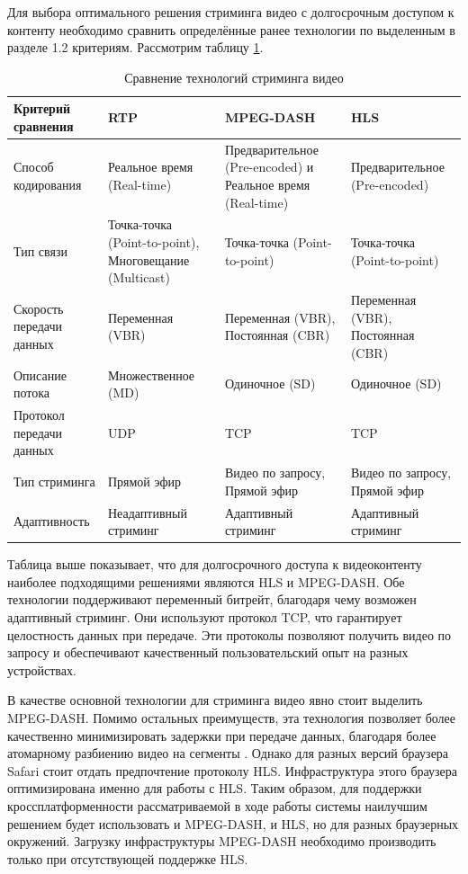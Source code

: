 	Для выбора оптимального решения стриминга видео с долгосрочным доступом к контенту необходимо сравнить определённые ранее технологии по выделенным в разделе 1.2 критериям. Рассмотрим таблицу \ref{fig:streaming_compare}.

	\begin{table} [htbp]%
		\centering\small
		\caption{Сравнение технологий стриминга видео}%
		\begin{tabular}{|p{3.5cm}|p{3.5cm}|p{3.5cm}|p{3.5cm}|}
			\hline
			Критерий сравнения&RTP&MPEG-DASH&HLS\\
			\hline
			Способ кодирования&Реальное время (Real-time)&Предварительное (Pre-encoded) и Реальное время (Real-time)&Предварительное (Pre-encoded)\\ \hline
			Тип связи&Точка-точка (Point-to-point), Многовещание (Multicast)&Точка-точка (Point-to-point)&Точка-точка (Point-to-point)\\ \hline
			Скорость передачи данных&Переменная (VBR)&Переменная (VBR), Постоянная (CBR)&Переменная (VBR), Постоянная (CBR)\\ \hline
			Описание потока&Множественное (MD)&Одиночное (SD)&Одиночное (SD)\\ \hline
			Протокол передачи данных&UDP&TCP&TCP\\ \hline
			Тип стриминга&Прямой эфир&Видео по запросу, Прямой эфир&Видео по запросу, Прямой эфир\\ \hline		
			Адаптивность&Неадаптивный стриминг&Адаптивный стриминг&Адаптивный стриминг\\ \hline		
		\end{tabular}	
		\label{fig:streaming_compare}
		\normalsize%
	\end{table}
	
	Таблица выше показывает, что для долгосрочного доступа к видеоконтенту наиболее подходящими решениями являются HLS и MPEG-DASH. Обе технологии поддерживают переменный битрейт, благодаря чему возможен адаптивный стриминг. Они используют протокол TCP, что гарантирует целостность данных при передаче. Эти протоколы позволяют получить видео по запросу и обеспечивают качественный пользовательский опыт на разных устройствах.
	
	В качестве основной технологии для стриминга видео явно стоит выделить MPEG-DASH. Помимо остальных преимуществ, эта технология позволяет более качественно минимизировать задержки при передаче данных, благодаря более атомарному разбиению видео на сегменты \cite{bouzakariaLowLatencyDash}. Однако для разных версий браузера Safari стоит отдать предпочтение протоколу HLS. Инфраструктура этого браузера оптимизирована именно для работы с HLS. Таким образом, для поддержки кроссплатформенности рассматриваемой в ходе работы системы наилучшим решением будет использовать и MPEG-DASH, и HLS, но для разных браузерных окружений. Загрузку инфраструктуры MPEG-DASH необходимо производить только при отсутствующей поддержке HLS.


